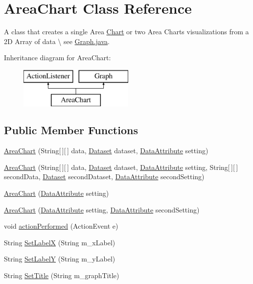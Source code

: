 \hypertarget{class_area_chart}{\section{Area\-Chart Class Reference}
\label{class_area_chart}
}


A class that creates a single Area \hyperlink{interface_chart}{Chart} or two Area Charts visualizations from a 2\-D Array of data \textbackslash{} see \hyperlink{_graph_8java}{Graph.\-java}.  


Inheritance diagram for Area\-Chart\-:\begin{figure}[H]
\begin{center}
\leavevmode
\includegraphics[height=2.000000cm]{class_area_chart}
\end{center}
\end{figure}
\subsection*{Public Member Functions}
\begin{DoxyCompactItemize}
\item 
\hyperlink{class_area_chart_ac274b6648f7927c1b21a5f2ccacdf015}{Area\-Chart} (String\mbox{[}$\,$\mbox{]}\mbox{[}$\,$\mbox{]} data, \hyperlink{class_dataset}{Dataset} dataset, \hyperlink{class_data_attribute}{Data\-Attribute} setting)
\item 
\hyperlink{class_area_chart_a89ef5b5df7dc6ca9aaa96987860bde17}{Area\-Chart} (String\mbox{[}$\,$\mbox{]}\mbox{[}$\,$\mbox{]} data, \hyperlink{class_dataset}{Dataset} dataset, \hyperlink{class_data_attribute}{Data\-Attribute} setting, String\mbox{[}$\,$\mbox{]}\mbox{[}$\,$\mbox{]} second\-Data, \hyperlink{class_dataset}{Dataset} second\-Dataset, \hyperlink{class_data_attribute}{Data\-Attribute} second\-Setting)
\item 
\hyperlink{class_area_chart_a7648545bfd821120ba898a1fbe693cd9}{Area\-Chart} (\hyperlink{class_data_attribute}{Data\-Attribute} setting)
\item 
\hyperlink{class_area_chart_a0fa85df1c042914db3ad989ebca7be30}{Area\-Chart} (\hyperlink{class_data_attribute}{Data\-Attribute} setting, \hyperlink{class_data_attribute}{Data\-Attribute} second\-Setting)
\item 
void \hyperlink{class_area_chart_a5d3648cf5639db988d10eb250058a362}{action\-Performed} (Action\-Event e)
\item 
String \hyperlink{class_area_chart_af7d8c59fa546b0f754adc9785fa4fb95}{Set\-Label\-X} (String m\-\_\-x\-Label)
\item 
String \hyperlink{class_area_chart_aa748c5e3dfc96c261f97673b5b51ecb5}{Set\-Label\-Y} (String m\-\_\-y\-Label)
\item 
String \hyperlink{class_area_chart_a0eec1001412cfee1b2d696addf56cdab}{Set\-Title} (String m\-\_\-graph\-Title)
\end{DoxyCompactItemize}
